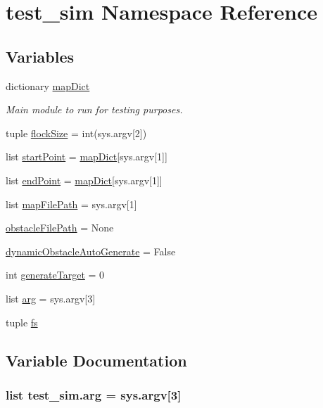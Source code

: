 \hypertarget{namespacetest__sim}{\section{test\-\_\-sim Namespace Reference}
\label{namespacetest__sim}
}
\subsection*{Variables}
\begin{DoxyCompactItemize}
\item 
dictionary \hyperlink{namespacetest__sim_a7550c4b395516fd2fa13ebfd927c9908}{map\-Dict}
\begin{DoxyCompactList}\small\item\em Main module to run for testing purposes. \end{DoxyCompactList}\item 
tuple \hyperlink{namespacetest__sim_ab2831c916fc9496cbc35d3dc973a3e9c}{flock\-Size} = int(sys.\-argv\mbox{[}2\mbox{]})
\item 
list \hyperlink{namespacetest__sim_a4b3a71baea25193edaa02f6e938da13c}{start\-Point} = \hyperlink{namespacetest__sim_a7550c4b395516fd2fa13ebfd927c9908}{map\-Dict}\mbox{[}sys.\-argv\mbox{[}1\mbox{]}\mbox{]}
\item 
list \hyperlink{namespacetest__sim_a74c9f896f25a6236b948f451aaab30bf}{end\-Point} = \hyperlink{namespacetest__sim_a7550c4b395516fd2fa13ebfd927c9908}{map\-Dict}\mbox{[}sys.\-argv\mbox{[}1\mbox{]}\mbox{]}
\item 
list \hyperlink{namespacetest__sim_a22fa561a6ceff64ebc9a613928ca6cb3}{map\-File\-Path} = sys.\-argv\mbox{[}1\mbox{]}
\item 
\hyperlink{namespacetest__sim_ae11191b484b7492bad167b40d991e12c}{obstacle\-File\-Path} = None
\item 
\hyperlink{namespacetest__sim_ac73cc5253c8afe364cddedc6a393f925}{dynamic\-Obstacle\-Auto\-Generate} = False
\item 
int \hyperlink{namespacetest__sim_a62047015d5d3114a87c78d8987e7a92e}{generate\-Target} = 0
\item 
list \hyperlink{namespacetest__sim_afad7233fcd251150d588589d48afa50e}{arg} = sys.\-argv\mbox{[}3\mbox{]}
\item 
tuple \hyperlink{namespacetest__sim_a2054957d15e42445f7dc826058f9799d}{fs}
\end{DoxyCompactItemize}


\subsection{Variable Documentation}
\hypertarget{namespacetest__sim_afad7233fcd251150d588589d48afa50e}{
\subsubsection[{arg}]{\setlength{\rightskip}{0pt plus 5cm}list test\-\_\-sim.\-arg = sys.\-argv\mbox{[}3\mbox{]}}}\label{namespacetest__sim_afad7233fcd251150d588589d48afa50e}



